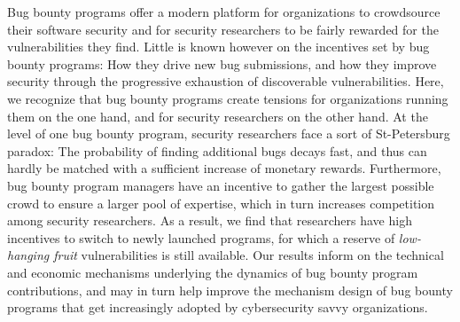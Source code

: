 Bug bounty programs offer a modern platform for organizations to crowdsource their software security and for security researchers to be fairly rewarded for the vulnerabilities they find. Little is known however on the incentives set by bug bounty programs: How they drive new bug submissions, and how they improve security through the progressive exhaustion of discoverable vulnerabilities. Here, we recognize that bug bounty programs create tensions for organizations running them on the one hand, and for security researchers on the other hand. At the level of one bug bounty program, security researchers face a sort of St-Petersburg paradox: The probability of finding additional bugs decays fast, and thus can hardly be matched with a sufficient increase of monetary rewards. Furthermore, bug bounty program managers have an incentive to gather the largest possible crowd to ensure a larger pool of expertise, which in turn increases competition among security researchers. As a result, we find that researchers have high incentives to switch to newly launched programs, for which a reserve of {\it low-hanging fruit} vulnerabilities is still available. Our results inform on the technical and economic mechanisms underlying the dynamics of bug bounty program contributions, and may in turn help improve the mechanism design of bug bounty programs that get increasingly adopted by cybersecurity savvy organizations.